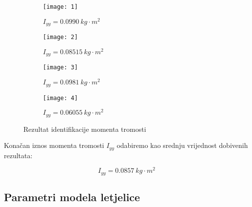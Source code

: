 \documentclass[11pt,a4paper]{article}
\begin{document}
\begin{figure}[H]
	\centering
	\begin{subfigure}{.5\textwidth}
		\centering
		\texttt{[image: 1]}
		\caption{$I_{yy} = 0.0990 \ kg \cdot m^{2}$}
		\label{fig:mj1}
	\end{subfigure}%
	\begin{subfigure}{.5\textwidth}
		\centering
		\texttt{[image: 2]}
		\caption{$I_{yy} = 0.08515 \ kg \cdot m^{2}$}
		\label{fig:mj2}
	\end{subfigure}
	\begin{subfigure}{.5\textwidth}
		\centering
		\texttt{[image: 3]}
		\caption{$I_{yy} = 0.0981 \ kg \cdot m^{2}$}
		\label{fig:mj3}
	\end{subfigure}%
	\begin{subfigure}{.5\textwidth}
		\centering
		\texttt{[image: 4]}
		\caption{$I_{yy} = 0.06055 \ kg \cdot m^{2}$}
		\label{fig:mj4}
	\end{subfigure}
	
	\caption{Rezultat identifikacije momenta tromosti}
	\label{fig:Iyy}
\end{figure} 



Konačan iznos momenta tromosti $I_{yy}$ odabiremo kao srednju vrijednost dobivenih rezultata:

\begin{equation}
\boxed{
I_{yy} = 0.0857 \ kg \cdot m^{2}
}
\label{eq:Iyy}
\end{equation}


\newpage

\subsection{Parametri modela letjelice}
\end{document}
